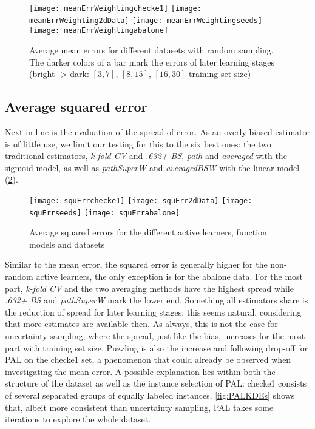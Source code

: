 \begin{figure}[h]
	\centering
	\texttt{[image: meanErrWeightingchecke1]}
	\texttt{[image: meanErrWeighting2dData]}
	\texttt{[image: meanErrWeightingseeds]}
	\texttt{[image: meanErrWeightingabalone]}
	\caption{Average mean errors for different datasets with random sampling. The darker colors of a bar mark the errors of later learning stages (bright -> dark: $[3,7]$, $[8,15]$, $[16,30]$ training set size)}
	\label{fig:meanErrorsWeighted}
\end{figure}

\subsection{Average squared error}

Next in line is the evaluation of the spread of error. As an overly biased estimator is of little use, we limit our testing for this to the six best ones: the two traditional estimators, \textit{k-fold CV} and \textit{.632+ BS}, \textit{path} and \textit{averaged} with the sigmoid model, as well as \textit{pathSuperW} and \textit{averagedBSW} with the linear model (\ref{fig:squaredErrors}).

\begin{figure}[h]
	\centering
	\texttt{[image: squErrchecke1]}
	\texttt{[image: squErr2dData]}
	\texttt{[image: squErrseeds]}
	\texttt{[image: squErrabalone]}
	\caption{Average squared errors for the different active learners, function models and datasets}
	\label{fig:squaredErrors}
\end{figure}

Similar to the mean error, the squared error is generally higher for the non-random active learners, the only exception is for the abalone data. For the most part, \textit{k-fold CV} and the two averaging methods have the highest spread while \textit{.632+ BS} and \textit{pathSuperW} mark the lower end. Something all estimators share is the reduction of spread for later learning stages; this seems natural, considering that more estimates are available then. As always, this is not the case for uncertainty sampling, where the spread, just like the bias, increases for the most part with training set size. Puzzling is also the increase and following drop-off for PAL on the checke1 set, a phenomenon that could already be observed when investigating the mean error. A possible explanation lies within both the structure of the dataset as well as the instance selection of PAL: checke1 consists of several separated groups of equally labeled instances. \ref{fig:PALKDEs} shows that, albeit more consistent than uncertainty sampling, PAL takes some iterations to explore the whole dataset.

